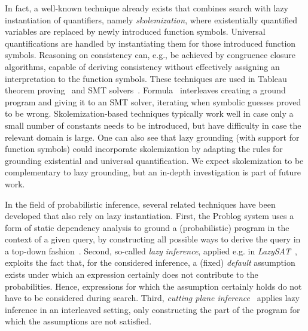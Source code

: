 \documentclass[11pt]{article}
\theoremstyle{plain}
\theoremstyle{definition}
\theoremstyle{example_basic}
\theoremstyle{example_contd}
\theoremstyle{plain}
\begin{document}
In fact, a well-known technique already exists that combines search with lazy instantiation of quantifiers, namely \emph{skolemization}, where existentially quantified variables are replaced by newly introduced function symbols. Universal quantifications are handled by instantiating them for those introduced function symbols. Reasoning on consistency can, e.g., be achieved by congruence closure algorithms, capable of deriving consistency without effectively assigning an interpretation to the function symbols. These techniques are used in Tableau theorem proving~\cite{el/RV01/Hahnle01} and SMT solvers~\cite{DBLP:journals/jacm/DetlefsNS05}.
Formula~\cite{formula/JacksonB13} interleaves creating a ground program and giving it to an SMT solver, iterating when symbolic guesses proved to be wrong.
Skolemization-based techniques typically work well in case only a small number of constants needs to be introduced, but have difficulty in case the relevant domain is large.
One can also see that lazy grounding (with support for function symbols) could incorporate skolemization by adapting the rules for grounding existential and universal quantification.
We expect skolemization to be complementary to lazy grounding, but an in-depth investigation is part of future work.

In the field of probabilistic inference, several related techniques have been developed that also rely on lazy instantiation. First, the Problog system uses a form of static dependency analysis to ground a (probabilistic) program in the context of a given query, by constructing all possible ways to derive the query in a top-down fashion~. Second, so-called \emph{lazy inference}, applied e.g. in \emph{LazySAT}~\cite{aaai/SinglaD06}, exploits the fact that, for the considered inference, a (fixed) \emph{default} assumption exists under which an expression certainly does not contribute to the probabilities. Hence, expressions for which the assumption certainly holds do not have to be considered during search. Third, \emph{cutting plane inference}~\cite{riedel09cutting} applies lazy inference in an interleaved setting, only constructing the part of the program for which the assumptions are not satisfied.
\end{document}
